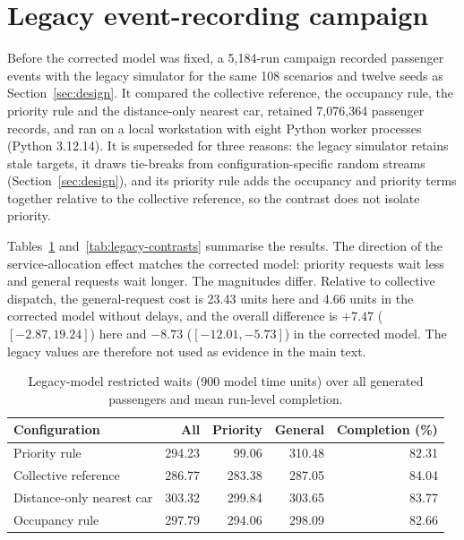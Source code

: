 \section{Legacy event-recording campaign}\label{app:legacy}
\setcounter{table}{0}
Before the corrected model was fixed, a 5,184-run campaign recorded passenger events with the legacy simulator for the same 108 scenarios and twelve seeds as Section~\ref{sec:design}. It compared the collective reference, the occupancy rule, the priority rule and the distance-only nearest car, retained 7,076,364 passenger records, and ran on a local workstation with eight Python worker processes (Python 3.12.14). It is superseded for three reasons: the legacy simulator retains stale targets, it draws tie-breaks from configuration-specific random streams (Section~\ref{sec:design}), and its priority rule adds the occupancy and priority terms together relative to the collective reference, so the contrast does not isolate priority.

Tables~\ref{tab:legacy-restricted} and~\ref{tab:legacy-contrasts} summarise the results. The direction of the service-allocation effect matches the corrected model: priority requests wait less and general requests wait longer. The magnitudes differ. Relative to collective dispatch, the general-request cost is 23.43 units here and 4.66 units in the corrected model without delays, and the overall difference is $+7.47$ ($[-2.87,19.24]$) here and $-8.73$ ($[-12.01,-5.73]$) in the corrected model. The legacy values are therefore not used as evidence in the main text.

\begin{table}[H]\centering
\caption{Legacy-model restricted waits (900 model time units) over all generated passengers and mean run-level completion.}\label{tab:legacy-restricted}
\small\begin{tabular}{@{}p{.30\linewidth}rrrr@{}}
\toprule Configuration & All & Priority & General & Completion (\%)\\\midrule
Priority rule & 294.23 & 99.06 & 310.48 & 82.31\\
Collective reference & 286.77 & 283.38 & 287.05 & 84.04\\
Distance-only nearest car & 303.32 & 299.84 & 303.65 & 83.77\\
Occupancy rule & 297.79 & 294.06 & 298.09 & 82.66\\
\bottomrule
\end{tabular}
\end{table}

